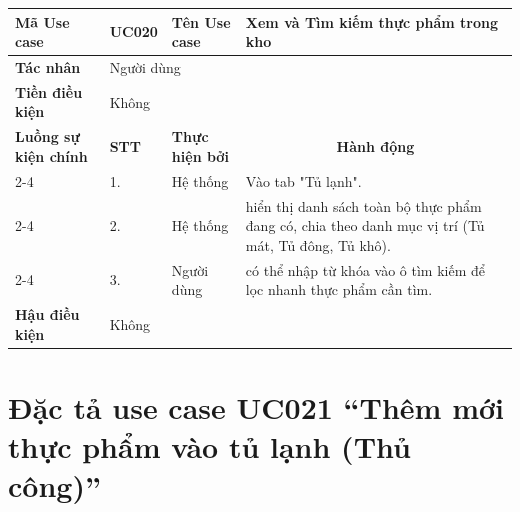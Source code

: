 \begin{longtable}{|p{2.7cm}|p{0.8cm}|p{2.6cm}|p{7.3cm}|}
\hline
\cellcolor[HTML]{D5F5E3}\textbf{Mã Use case} & \multicolumn{1}{l|}{UC020} & \cellcolor[HTML]{D5F5E3}\textbf{Tên Use case} & Xem và Tìm kiếm thực phẩm trong kho \\ \hline
\cellcolor[HTML]{D5F5E3}\textbf{Tác nhân} & \multicolumn{3}{p{10.7cm}|}{Người dùng} \\ \hline
\cellcolor[HTML]{D5F5E3}\textbf{Tiền điều kiện} & \multicolumn{3}{p{10.7cm}|}{Không} \\ \hline

\cellcolor[HTML]{D5F5E3}\textbf{Luồng sự kiện chính} & \cellcolor[HTML]{FDEBD0}\textbf{STT} & \cellcolor[HTML]{FDEBD0}\textbf{Thực hiện bởi} & \multicolumn{1}{c|}{\cellcolor[HTML]{FDEBD0}\textbf{Hành động}} \\ \cline{2-4} 
\cellcolor[HTML]{D5F5E3} & 1. & Hệ thống & Vào tab "Tủ lạnh". \\ \cline{2-4} 
\cellcolor[HTML]{D5F5E3} & 2. & Hệ thống & hiển thị danh sách toàn bộ thực phẩm đang có, chia theo danh mục vị trí (Tủ mát, Tủ đông, Tủ khô). \\ \cline{2-4} 
\cellcolor[HTML]{D5F5E3} & 3. & Người dùng & có thể nhập từ khóa vào ô tìm kiếm để lọc nhanh thực phẩm cần tìm. \\ \hline

\cellcolor[HTML]{D5F5E3}\textbf{Hậu điều kiện} & \multicolumn{3}{p{10.7cm}|}{Không} \\ \hline
\end{longtable}
\endgroup

\section{Đặc tả use case UC021 ``Thêm mới thực phẩm vào tủ lạnh (Thủ công)''}
\vspace{0.5cm}

\begingroup
\renewcommand{\arraystretch}{1.5}

